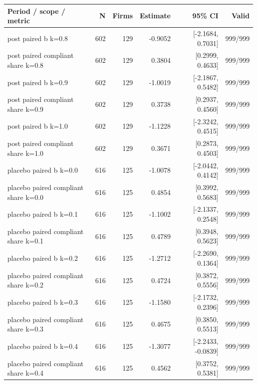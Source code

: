 \begin{threeparttable}
\begin{tabular}{p{6.0cm}rrrrr}
\toprule
Period / scope / metric & N & Firms & Estimate & 95\% CI & Valid \\
\midrule
post paired b k=0.8 & 602 & 129 & -0.9052 & [-2.1684, 0.7031] & 999/999 \\
post paired compliant share k=0.8 & 602 & 129 & 0.3804 & [0.2999, 0.4633] & 999/999 \\
post paired b k=0.9 & 602 & 129 & -1.0019 & [-2.1867, 0.5482] & 999/999 \\
post paired compliant share k=0.9 & 602 & 129 & 0.3738 & [0.2937, 0.4560] & 999/999 \\
post paired b k=1.0 & 602 & 129 & -1.1228 & [-2.3242, 0.4515] & 999/999 \\
post paired compliant share k=1.0 & 602 & 129 & 0.3671 & [0.2873, 0.4503] & 999/999 \\
placebo paired b k=0.0 & 616 & 125 & -1.0078 & [-2.0442, 0.4142] & 999/999 \\
placebo paired compliant share k=0.0 & 616 & 125 & 0.4854 & [0.3992, 0.5683] & 999/999 \\
placebo paired b k=0.1 & 616 & 125 & -1.1002 & [-2.1337, 0.2548] & 999/999 \\
placebo paired compliant share k=0.1 & 616 & 125 & 0.4789 & [0.3948, 0.5623] & 999/999 \\
placebo paired b k=0.2 & 616 & 125 & -1.2712 & [-2.2690, 0.1364] & 999/999 \\
placebo paired compliant share k=0.2 & 616 & 125 & 0.4724 & [0.3872, 0.5556] & 999/999 \\
placebo paired b k=0.3 & 616 & 125 & -1.1580 & [-2.1732, 0.2396] & 999/999 \\
placebo paired compliant share k=0.3 & 616 & 125 & 0.4675 & [0.3850, 0.5513] & 999/999 \\
placebo paired b k=0.4 & 616 & 125 & -1.3077 & [-2.2433, -0.0839] & 999/999 \\
placebo paired compliant share k=0.4 & 616 & 125 & 0.4562 & [0.3752, 0.5381] & 999/999 \\
\bottomrule
\end{tabular}
\begin{tablenotes}[flushleft]\footnotesize

\end{tablenotes}
\end{threeparttable}
